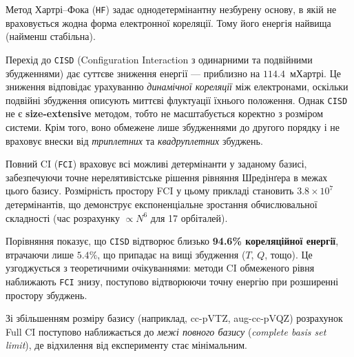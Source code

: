 Метод Хартрі–Фока (\texttt{HF}) задає однодетермінантну
незбурену основу, в якій не враховується жодна форма електронної кореляції.
Тому його енергія найвища (найменш стабільна).

Перехід до \texttt{CISD} (Configuration Interaction з одинарними та подвійними збудженнями)
дає суттєве зниження енергії --- приблизно на $114.4$~мХартрі.
Це зниження відповідає урахуванню \emph{динамічної кореляції} між електронами,
оскільки подвійні збудження описують миттєві флуктуації їхнього положення.
Однак \texttt{CISD} не є \textbf{size-extensive} методом, тобто не масштабується коректно з розміром системи.
Крім того, воно обмежене лише збудженнями до другого порядку і не враховує
внески від \emph{триплетних} та \emph{квадруплетних} збуджень.

Повний CI (\texttt{FCI}) враховує всі можливі детермінанти у заданому базисі,
забезпечуючи точне нерелятивістське рішення рівняння Шредінґера в межах цього базису.
Розмірність простору FCI у цьому прикладі становить
$3.8\times10^{7}$ детермінантів, що демонструє експоненціальне зростання обчислювальної складності
(час розрахунку $\propto N^6$ для 17 орбіталей).

Порівняння показує, що \texttt{CISD} відтворює близько \textbf{94.6\% кореляційної енергії},
втрачаючи лише $5.4\%$, що припадає на вищі збудження ($T$, $Q$, тощо).
Це узгоджується з теоретичними очікуваннями: методи CI обмеженого рівня
наближають \texttt{FCI} знизу, поступово відтворюючи точну енергію при розширенні простору збуджень.

Зі збільшенням розміру базису (наприклад, cc-pVTZ, aug-cc-pVQZ)
розрахунок Full CI поступово наближається до \emph{межі повного базису}
(\emph{complete basis set limit}), де відхилення від експерименту стає мінімальним.


